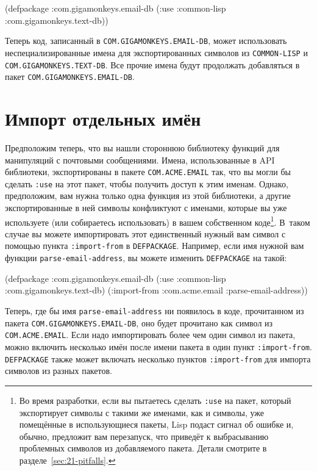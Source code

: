 \begin{myverb}
(defpackage :com.gigamonkeys.email-db
  (:use :common-lisp :com.gigamonkeys.text-db))
\end{myverb}

Теперь код, записанный в \lstinline{COM.GIGAMONKEYS.EMAIL-DB}, может использовать
неспециализированные имена для экспортированных символов из \lstinline{COMMON-LISP} и
\lstinline{COM.GIGAMONKEYS.TEXT-DB}. Все прочие имена будут продолжать добавляться в пакет
\lstinline{COM.GIGAMONKEYS.EMAIL-DB}.

\section{Импорт отдельных имён}

Предположим теперь, что вы нашли стороннюю библиотеку функций для манипуляций с почтовыми
сообщениями. Имена, использованные в API библиотеки, экспортированы в пакете
\lstinline{COM.ACME.EMAIL} так, что вы могли бы сделать \lstinline{:use} на этот пакет, чтобы
получить доступ к этим именам. Однако, предположим, вам нужна только одна функция из этой
библиотеки, а другие экспортированные в ней символы конфликтуют с именами, которые вы уже
используете (или собираетесь использовать) в вашем собственном коде\footnote{Во время
  разработки, если вы пытаетесь сделать \lstinline{:use} на пакет, который экспортирует символы
  с такими же именами, как и символы, уже помещённые в использующиеся пакеты, Lisp подаст
  сигнал об ошибке и, обычно, предложит вам перезапуск, что приведёт к выбрасыванию
  проблемных символов из добавляемого пакета. Детали смотрите в
  разделе~\ref{sec:21-pitfalls}.}. В~таком случае вы можете импортировать этот единственный
нужный вам символ с помощью пункта \lstinline{:import-from} в \lstinline{DEFPACKAGE}. Например, если
имя нужной вам функции \lstinline{parse-email-address}, вы можете изменить \lstinline{DEFPACKAGE} на
такой:

\begin{myverb}
(defpackage :com.gigamonkeys.email-db
  (:use :common-lisp :com.gigamonkeys.text-db)
  (:import-from :com.acme.email :parse-email-address))
\end{myverb}

Теперь, где бы имя \lstinline{parse-email-address} ни появилось в коде, прочитанном из пакета
\lstinline{COM.GIGAMONKEYS.EMAIL-DB}, оно будет прочитано как символ из
\lstinline{COM.ACME.EMAIL}. Если надо импортировать более чем один символ из пакета, можно
включить несколько имён после имени пакета в один пункт \lstinline{:import-from}.
\lstinline{DEFPACKAGE} также может включать несколько пунктов \lstinline{:import-from} для импорта
символов из разных пакетов.

